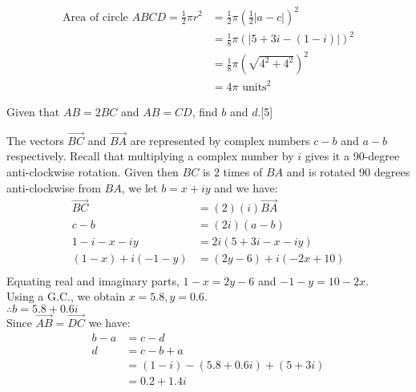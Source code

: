 \documentclass[12pt, a4 paper]{article}
\begin{document}
\begin{outline}[enumerate]
\begin{answer}
		\begin{align*}
			\textrm{Area of circle }ABCD = \frac{1}{2}\pi r^2
			  & = \frac{1}{2}\pi (\frac{1}{2}|a-c|)^2 \\
			  & = \frac{1}{8}\pi (|5+3i-(1-i)|)^2     \\
			  & = \frac{1}{8}\pi (\sqrt{4^2 + 4^2})^2 \\
			  & = 4\pi \textrm{ units}^2
		\end{align*}
	\end{answer}
	\2 Given that $AB=2BC$ and $AB=CD$, find $b$ and $d$.\hfill[5]
	\begin{answer}
		The vectors $\overrightarrow {BC}$ and $\overrightarrow {BA}$ are represented by complex numbers $c-b$ and $a-b$ respectively. Recall that multiplying a complex number by $i$ gives it a 90-degree anti-clockwise rotation. Given then $BC$ is 2 times of $BA$ and is rotated 90 degrees anti-clockwise from $BA$, we let $b=x+iy$ and we have:
		\begin{align*}
			\overrightarrow {BC} & = (2)(i)\overrightarrow {BA} \\
			c-b                  & = (2i)(a-b)                  \\
			1-i-x-iy             & = 2i(5+3i-x-iy)              \\
			(1-x)+i(-1-y)        & =(2y-6)+i(-2x+10)            \\
		\end{align*}
		Equating real and imaginary parts, $1-x=2y-6$ and $-1-y=10-2x$.\\
		Using a G.C., we obtain $x=5.8,y=0.6$.\\
		$\therefore b=5.8+0.6i$\\
		Since $\overrightarrow {AB} = \overrightarrow {DC}$ we have:
		\begin{align*}
			b-a & = c-d                     \\
			d   & = c-b+a                   \\
			    & = (1-i)-(5.8+0.6i)+(5+3i) \\
			    & = 0.2+1.4i
		\end{align*}
	\end{answer}
\end{outline}
\end{document}
